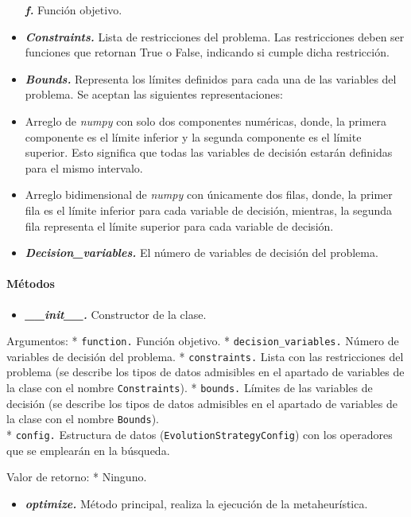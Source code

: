 \documentclass[11pt]{article}
\providecommand{\tightlist}{%
      \setlength{\itemsep}{0pt}\setlength{\parskip}{0pt}}
\begin{document}
\begin{itemize}
  \emph{\textbf{f.}} Función objetivo.
\item
  \emph{\textbf{Constraints.}} Lista de restricciones del problema. Las
  restricciones deben ser funciones que retornan True o False, indicando
  si cumple dicha restricción.
\item
  \emph{\textbf{Bounds.}} Representa los límites definidos para cada una
  de las variables del problema. Se aceptan las siguientes
  representaciones:
\item
  Arreglo de \emph{numpy} con solo dos componentes numéricas, donde, la
  primera componente es el límite inferior y la segunda componente es el
  límite superior. Esto significa que todas las variables de decisión
  estarán definidas para el mismo intervalo.
\item
  Arreglo bidimensional de \emph{numpy} con únicamente dos filas, donde,
  la primer fila es el límite inferior para cada variable de decisión,
  mientras, la segunda fila representa el límite superior para cada
  variable de decisión.
\item
  \emph{\textbf{Decision\_variables.}} El número de variables de
  decisión del problema.
\end{itemize}

\paragraph{Métodos}\label{muxe9todos}

    \begin{itemize}
\tightlist
\item
  \emph{\textbf{\_\_init\_\_.}} Constructor de la clase.
\end{itemize}

Argumentos: * \texttt{function.} Función objetivo. *
\texttt{decision\_variables.} Número de variables de decisión del
problema. * \texttt{constraints.} Lista con las restricciones del
problema (se describe los tipos de datos admisibles en el apartado de
variables de la clase con el nombre \texttt{Constraints}). *
\texttt{bounds.} Límites de las variables de decisión (se describe los
tipos de datos admisibles en el apartado de variables de la clase con el
nombre \texttt{Bounds}).\\
* \texttt{config.} Estructura de datos
(\texttt{EvolutionStrategyConfig}) con los operadores que se emplearán
en la búsqueda.

Valor de retorno: * Ninguno.

    \begin{itemize}
\tightlist
\item
  \emph{\textbf{optimize.}} Método principal, realiza la ejecución de la
  metaheurística.
\end{itemize}
\end{document}
